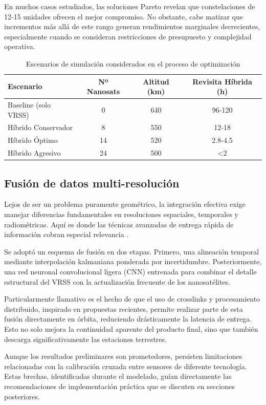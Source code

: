 En muchos casos estudiados, las soluciones Pareto revelan que constelaciones de 12-15 unidades ofrecen el mejor compromiso. No obstante, cabe matizar que incrementos más allá de este rango generan rendimientos marginales decrecientes, especialmente cuando se consideran restricciones de presupuesto y complejidad operativa.

\begin{table}[h]
\centering
\caption{Escenarios de simulación considerados en el proceso de optimización}
\label{tab:escenarios_simulacion}
\begin{tabular}{lccc}
\hline
\textbf{Escenario} & \textbf{Nº Nanosats} & \textbf{Altitud (km)} & \textbf{Revisita Híbrida (h)} \\
\hline
Baseline (solo VRSS) & 0 & 640 & 96-120 \\
Híbrido Conservador & 8 & 550 & 12-18 \\
Híbrido Óptimo & 14 & 520 & 2.8-4.5 \\
Híbrido Agresivo & 24 & 500 & <2 \\
\hline
\end{tabular}
\end{table}

\subsection{Fusión de datos multi-resolución}

Lejos de ser un problema puramente geométrico, la integración efectiva exige manejar diferencias fundamentales en resoluciones espaciales, temporales y radiométricas. Aquí es donde las técnicas avanzadas de entrega rápida de información cobran especial relevancia \cite{Chan2024}.

Se adoptó un esquema de fusión en dos etapas. Primero, una alineación temporal mediante interpolación kalmaniana ponderada por incertidumbre. Posteriormente, una red neuronal convolucional ligera (CNN) entrenada para combinar el detalle estructural del VRSS con la actualización frecuente de los nanosatélites. 

Particularmente llamativo es el hecho de que el uso de crosslinks y procesamiento distribuido, inspirado en propuestas recientes, permite realizar parte de esta fusión directamente en órbita, reduciendo drásticamente la latencia de entrega. Esto no solo mejora la continuidad aparente del producto final, sino que también descarga significativamente las estaciones terrestres.

Aunque los resultados preliminares son prometedores, persisten limitaciones relacionadas con la calibración cruzada entre sensores de diferente tecnología. Estas brechas, identificadas durante el modelado, guían directamente las recomendaciones de implementación práctica que se discuten en secciones posteriores.